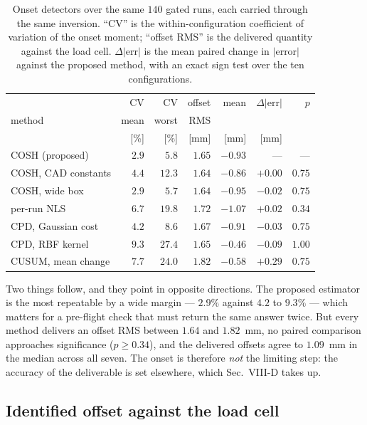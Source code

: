 \documentclass[10pt]{article}
\begin{document}
\begin{table}[t]
\centering
\caption{Onset detectors over the same $140$ gated runs, each carried
through the same inversion. ``CV'' is the within-configuration
coefficient of variation of the onset moment; ``offset RMS'' is the
delivered quantity against the load cell. $\Delta|$err$|$ is the mean
paired change in $|$error$|$ against the proposed method, with an
exact sign test over the ten configurations.}
\label{tab:bench}
\small
\setlength{\tabcolsep}{4pt}
\begin{tabular}{@{}l rr rr rr@{}}
\hline
 & CV & CV & offset & mean & $\Delta|$err$|$ & $p$ \\
method & mean & worst & RMS & & & \\
 & [\%] & [\%] & [mm] & [mm] & [mm] & \\
\hline
COSH (proposed)      & $2.9$ & $5.8$  & $1.65$ & $-0.93$ & ---     & --- \\
COSH, CAD constants  & $4.4$ & $12.3$ & $1.64$ & $-0.86$ & $+0.00$ & $0.75$\\
COSH, wide box       & $2.9$ & $5.7$  & $1.64$ & $-0.95$ & $-0.02$ & $0.75$\\
per-run NLS          & $6.7$ & $19.8$ & $1.72$ & $-1.07$ & $+0.02$ & $0.34$\\
CPD, Gaussian cost   & $4.2$ & $8.6$  & $1.67$ & $-0.91$ & $-0.03$ & $0.75$\\
CPD, RBF kernel      & $9.3$ & $27.4$ & $1.65$ & $-0.46$ & $-0.09$ & $1.00$\\
CUSUM, mean change   & $7.7$ & $24.0$ & $1.82$ & $-0.58$ & $+0.29$ & $0.75$\\
\hline
\end{tabular}
\end{table}

Two things follow, and they point in opposite directions. The proposed
estimator is the most repeatable by a wide margin --- $2.9\%$ against
$4.2$ to $9.3\%$ --- which matters for a pre-flight check that must
return the same answer twice. But every method delivers an offset RMS
between $1.64$ and $1.82$~mm, no paired comparison approaches
significance ($p\ge0.34$), and the delivered offsets agree to
$1.09$~mm in the median across all seven. The onset is therefore
\emph{not} the limiting step: the accuracy of the deliverable is set
elsewhere, which Sec.~VIII-D takes up.

\subsection*{Identified offset against the load cell}
\end{document}
